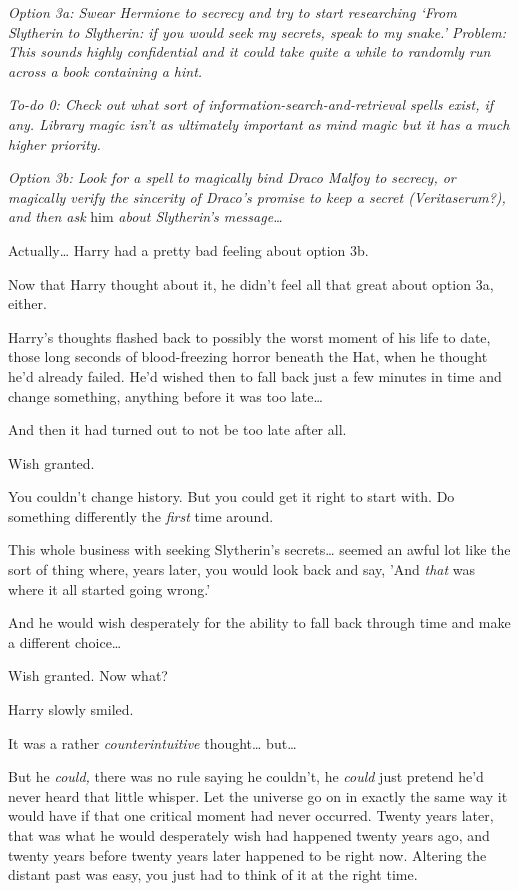 \emph{Option 3a: Swear Hermione to secrecy and try to start researching `From 
Slytherin to Slytherin: if you would seek my secrets, speak to my snake.' 
Problem: This sounds highly confidential and it could take quite a while to 
randomly run across a book containing a hint.}

\emph{To-do 0: Check out what sort of information-search-and-retrieval spells 
exist, if any. Library magic isn't as ultimately important as mind magic but it 
has a much higher priority.}

\emph{Option 3b: Look for a spell to magically bind Draco Malfoy to secrecy, or 
magically verify the sincerity of Draco's promise to keep a secret 
(Veritaserum?), and then ask} him \emph{about Slytherin's message{\ldots}}

Actually{\ldots} Harry had a pretty bad feeling about option 3b.

Now that Harry thought about it, he didn't feel all that great about option 3a, 
either.

Harry's thoughts flashed back to possibly the worst moment of his life to date, 
those long seconds of blood-freezing horror beneath the Hat, when he thought 
he'd already failed. He'd wished then to fall back just a few minutes in time 
and change something, anything before it was too late{\ldots}

And then it had turned out to not be too late after all.

Wish granted.

You couldn't change history. But you could get it right to start with. Do 
something differently the \emph{first} time around.

This whole business with seeking Slytherin's secrets{\ldots} seemed an awful 
lot like the sort of thing where, years later, you would look back and say, 
'And \emph{that} was where it all started going wrong.'

And he would wish desperately for the ability to fall back through time and 
make a different choice{\ldots}

Wish granted. Now what?

Harry slowly smiled.

It was a rather \emph{counterintuitive} thought{\ldots} but{\ldots}

But he \emph{could,} there was no rule saying he couldn't, he \emph{could} just 
pretend he'd never heard that little whisper. Let the universe go on in exactly 
the same way it would have if that one critical moment had never occurred. 
Twenty years later, that was what he would desperately wish had happened twenty 
years ago, and twenty years before twenty years later happened to be right now. 
Altering the distant past was easy, you just had to think of it at the right 
time.

